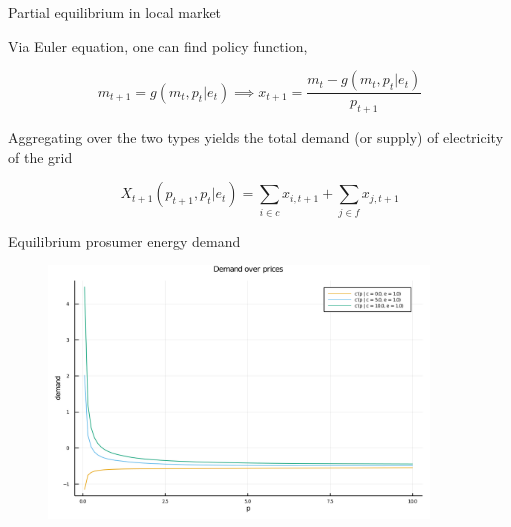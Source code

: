 \documentclass[xcolor={svgnames}]{beamer}
\begin{document}
\begin{frame}{Partial equilibrium in local market}

    Via Euler equation, one can find policy function,

    \begin{equation}
        m_{t+1} = g(m_t, p_t \vert e_t) \implies x_{t+1} = \frac{m_t - g(m_t, p_t \vert e_t)}{p_{t+1}}
    \end{equation}

    Aggregating over the two types yields the total demand (or supply) of electricity of the grid

    \begin{equation}
        X_{t+1}(p_{t+1}, p_t \vert e_t) = \sum_{i \in c} x_{i, t+1} + \sum_{j \in f} x_{j, t+1}
    \end{equation}

\end{frame}


\begin{frame}{Equilibrium prosumer energy demand}
    \begin{figure}
        \centering
        \includegraphics[width=0.9\textwidth]{../../plots/markets/pricedemand.png}
    \end{figure}
\end{frame}
\end{document}
